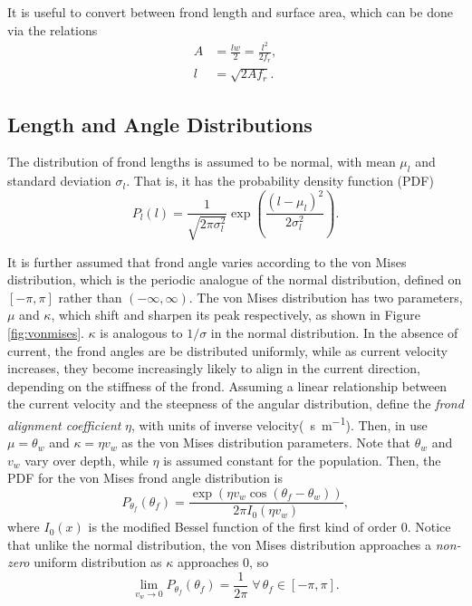 It is useful to convert between frond length and surface area, which can be done via the relations
\begin{align}
  A &= \frac{lw}{2} = \frac{l^2}{2f_r}, \\
  l &= \sqrt{2Af_r}.
  \label{eqn:length-from-area}
\end{align}

\subsection{Length and Angle Distributions}
\label{sec:dist}
The distribution of frond lengths is assumed to be normal, with mean $\mu_l$ and standard deviation $\sigma_l$.
That is, it has the probability density function (PDF)
\begin{equation*}
  P_l(l) = \frac{1}{\sqrt{2\pi\sigma_l^2}}\exp\left(\frac{(l-\mu_l)^2}{2\sigma_l^2}\right).
\end{equation*}

It is further assumed that frond angle varies according to the von Mises distribution, which is the periodic analogue of the normal distribution, defined on $[-\pi,\pi]$ rather than $(-\infty,\infty)$.
The von Mises distribution has two parameters, $\mu$ and $\kappa$, which shift and sharpen its peak respectively, as shown in Figure \ref{fig:vonmises}.
$\kappa$ is analogous to $1/\sigma$ in the normal distribution.
In the absence of current, the frond angles are be distributed uniformly, while as current velocity increases, they become increasingly likely to align in the current direction, depending on the stiffness of the frond.
Assuming a linear relationship between the current velocity and the steepness of the angular distribution, define the \textit{frond alignment coefficient} $\eta$, with units of inverse velocity(\SI{}{\s\per\m}).
Then, in use $\mu = \theta_w$ and $\kappa = \eta v_w$ as the von Mises distribution parameters.
Note that $\theta_w$ and $v_w$ vary over depth, while $\eta$ is assumed constant for the population.
Then, the PDF for the von Mises frond angle distribution is
\begin{equation*}
	P_{\theta_f}(\theta_f) = \frac{\exp\left(\eta v_w\cos(\theta_f-\theta_w)\right)}{2\pi I_0(\eta v_w)},
\end{equation*}
where $I_0(x)$ is the modified Bessel function of the first kind of order 0.
Notice that unlike the normal distribution, the von Mises distribution approaches a \textit{non-zero} uniform distribution as $\kappa$ approaches 0, so
\begin{equation*}
	\displaystyle \lim_{v_w \to 0}P_{\theta_f}(\theta_f) = \frac{1}{2\pi} \;\forall\, \theta_f \in [-\pi,\pi].
\end{equation*}

